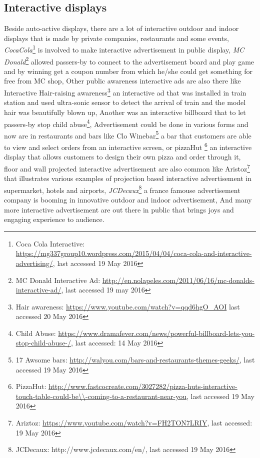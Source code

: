 \subsection{Interactive displays}
Beside auto-active displays, there are a lot of interactive outdoor and indoor displays that is made by private companies, restaurants and some events, \emph{CocaCola}\footnote{Coca Cola Interactive: \url{https://mg337group10.wordpress.com/2015/04/04/coca-cola-and-interactive-advertising/}, last accessed 19 May 2016} is involved to make interactive advertisement in public display, \emph{MC Donald}\footnote{MC Donald Interactive Ad: \url{http://en.nolapeles.com/2011/06/16/mc-donalds-interactive-ad/}, last accessed 19 may 2016} allowed passers-by to connect to the advertisement board and play game and by winning get a coupon number from which he/she could get something for free from MC shop, Other public awareness interactive ads are also there like Interactive Hair-raising awareness\footnote{Hair awareness: \url{https://www.youtube.com/watch?v=qqd6hgO_AOI} last accessed 20 May 2016} an interactive ad that was installed in train station and used ultra-sonic sensor to detect the arrival of train and the model hair was beautifully blown up, Another was an interactive billboard that to let passers-by stop child abuse\footnote{Child Abuse: \url{https://www.dramafever.com/news/powerful-billboard-lets-you-stop-child-abuse-/}, last accessed: 14 May 2016}, Advertisement could be done in various forms and now are in restaurants and bars like Clo Winebar\footnote{17 Awsome bars: \url{http://walyou.com/bars-and-restaurants-themes-geeks/}, last accessed 19 May 2016} a bar that customers are able to view and select orders from an interactive screen, or pizzaHut \footnote{PizzaHut: \url{http://www.fastcocreate.com/3027282/pizza-huts-interactive-touch-table-could-be\\-coming-to-a-restaurant-near-you}, last accessed 19 May 2016} an interactive display that allows customers to design their own pizza and order through it, floor and wall projected interactive advertisement are also common like Aristoz\footnote{Ariztoz: \url{https://www.youtube.com/watch?v=FH2TON7LRIY}, last accessed: 19 May 2016} that illustrates various examples of projection based interactive advertisement in supermarket, hotels and airports, \emph{JCDecaux}\footnote{JCDecaux: http://www.jcdecaux.com/en/, last accessed 19 May 2016} a france famouse advertisement company is booming in innovative outdoor and indoor advertisement, And many more interactive advertisement are out there in public that brings joys and engaging experience to audience.  


